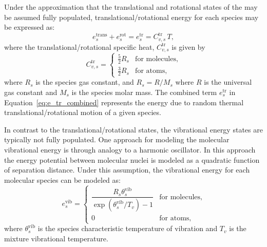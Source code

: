 \documentclass[10pt]{article}
\newcommand{\vib}{\text{vib}}
\begin{document}
Under the approximation that the translational and rotational states of the may be assumed fully populated, translational/rotational energy for each species may be expressed as:
\begin{equation}
 \label{eq:e_tr_combined}
 e^{\text{trans}}_s + e^{\text{rot}}_s = e^{\text{tr}}_s = C^{\text{tr}}_{v,s}\, T ,
\end{equation}
where the translational/rotational specific heat, $C^{\text{tr}}_{v,s}$ is given by
\begin{equation*}
 C^{\text{tr}}_{v,s} =
 \begin{cases}
 \frac{5}{2} R_s & \text{for molecules}, \\
 \frac{3}{2} R_s & \text{for atoms},
 \end{cases}
\end{equation*}
where $R_s$ is the species gas constant, and $R_s = R/M_s$ where $R$ is the universal gas constant and $M_s$ is the species molar mass. The combined term $e^{\text{tr}}_s$ in Equation~\eqref{eq:e_tr_combined} represents the energy due to random thermal translational/rotational motion of a given species.

In contrast to the translational/rotational states, the vibrational energy states are typically not fully populated. One approach for modeling the molecular vibrational energy is through analogy to a harmonic oscillator.  In this approach the energy potential between molecular nuclei is modeled as a quadratic function of separation distance.  Under this assumption, the vibrational energy for each molecular species can be modeled as:
\begin{equation}
  \label{eq:species_vibrational_energy}
  e^{\text{vib}}_s = 
  \begin{cases}    
    \dfrac{R_s\theta^{\vib}_{s}}{\exp\left(\theta^{\vib}_{s}/T_v\right) - 1} & \text{for molecules}, \\
    0 & \text{for atoms},
  \end{cases}
\end{equation}
where $\theta^{\vib}_{s}$ is the species characteristic temperature of vibration and $T_v$ is the mixture vibrational temperature.

\end{document}
